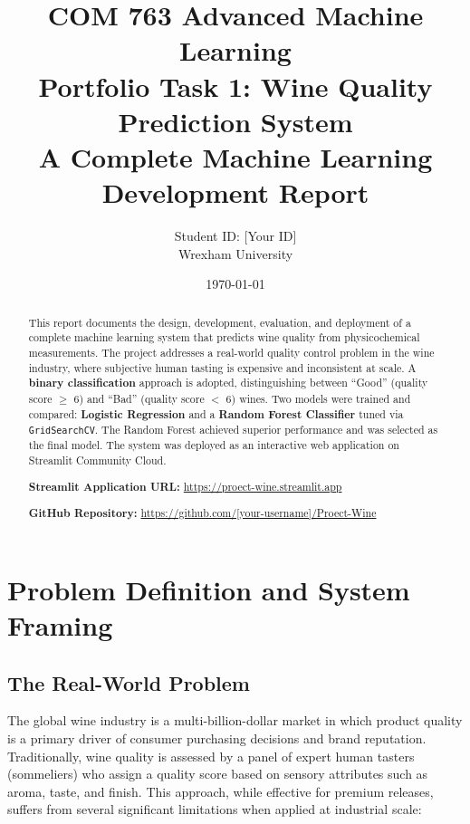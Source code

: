\documentclass[11pt,a4paper]{article}
\title{%
  \vspace{-1cm}
  \textbf{COM 763 Advanced Machine Learning}\\[0.5em]
  \large Portfolio Task 1: Wine Quality Prediction System\\[0.3em]
  \normalsize A Complete Machine Learning Development Report
}
\author{Student ID: [Your ID] \\ Wrexham University}
\date{\today}
\begin{document}
\maketitle
\thispagestyle{empty}

\begin{abstract}
\noindent
This report documents the design, development, evaluation, and deployment of a complete machine learning system that predicts wine quality from physicochemical measurements. The project addresses a real-world quality control problem in the wine industry, where subjective human tasting is expensive and inconsistent at scale. A \textbf{binary classification} approach is adopted, distinguishing between ``Good'' (quality score $\geq$ 6) and ``Bad'' (quality score $<$ 6) wines. Two models were trained and compared: \textbf{Logistic Regression} and a \textbf{Random Forest Classifier} tuned via \texttt{GridSearchCV}. The Random Forest achieved superior performance and was selected as the final model. The system was deployed as an interactive web application on Streamlit Community Cloud.

\smallskip
\noindent\textbf{Streamlit Application URL:} \url{https://proect-wine.streamlit.app}

\smallskip
\noindent\textbf{GitHub Repository:} \url{https://github.com/[your-username]/Proect-Wine}
\end{abstract}

\tableofcontents
\newpage

\section{Problem Definition and System Framing}

\subsection{The Real-World Problem}

The global wine industry is a multi-billion-dollar market in which product quality is a primary driver of consumer purchasing decisions and brand reputation. Traditionally, wine quality is assessed by a panel of expert human tasters (sommeliers) who assign a quality score based on sensory attributes such as aroma, taste, and finish. This approach, while effective for premium releases, suffers from several significant limitations when applied at industrial scale:
\end{document}
